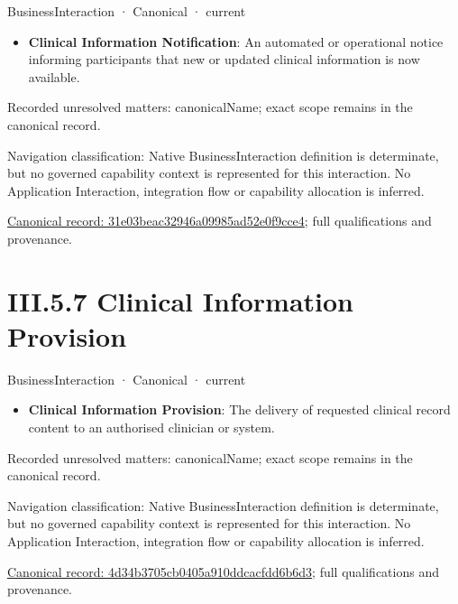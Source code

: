 \label{element:31e03beac32946a09985ad52e0f9cce4}
{\small BusinessInteraction · Canonical · current}\par

\begin{itemize}


\item \textbf{Clinical Information Notification}: An automated or operational notice informing participants that new or updated clinical information is now available.

\end{itemize}

{\small Recorded unresolved matters: canonicalName; exact scope remains in the canonical record.}\par
{\small Navigation classification: Native BusinessInteraction definition is determinate, but no governed capability context is represented for this interaction. No Application Interaction, integration flow or capability allocation is inferred.}\par
{\footnotesize \href{../../../../../../../../continuum/business/business-interaction/31e03beac32946a09985ad52e0f9cce4.md}{Canonical record: 31e03beac32946a09985ad52e0f9cce4}; full qualifications and provenance.}\par
\section*{III.5.7 Clinical Information Provision}
\label{navigation:III.5.7}

\label{element:4d34b3705cb0405a910ddcacfdd6b6d3}
{\small BusinessInteraction · Canonical · current}\par

\begin{itemize}


\item \textbf{Clinical Information Provision}: The delivery of requested clinical record content to an authorised clinician or system.

\end{itemize}

{\small Recorded unresolved matters: canonicalName; exact scope remains in the canonical record.}\par
{\small Navigation classification: Native BusinessInteraction definition is determinate, but no governed capability context is represented for this interaction. No Application Interaction, integration flow or capability allocation is inferred.}\par
{\footnotesize \href{../../../../../../../../continuum/business/business-interaction/4d34b3705cb0405a910ddcacfdd6b6d3.md}{Canonical record: 4d34b3705cb0405a910ddcacfdd6b6d3}; full qualifications and provenance.}\par
